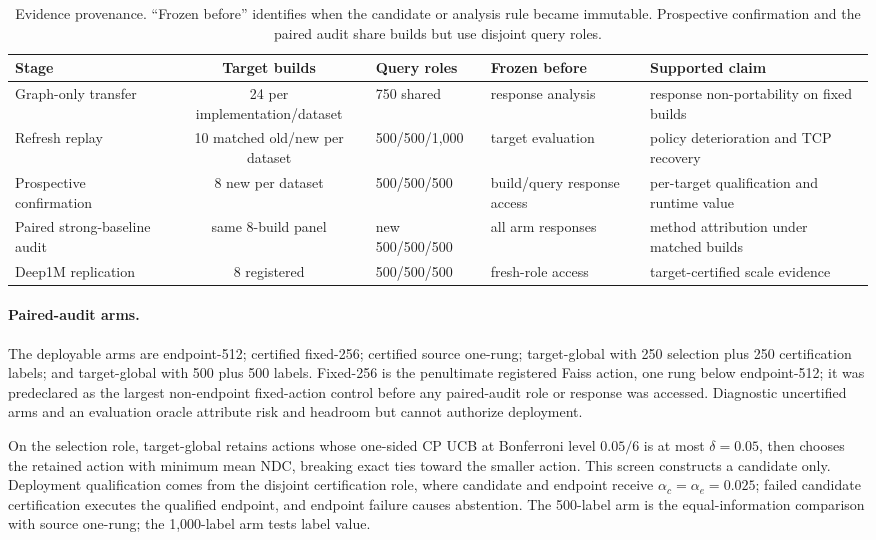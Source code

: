 \begin{table}[t]
\caption{Evidence provenance. ``Frozen before'' identifies when the candidate or analysis rule became immutable. Prospective confirmation and the paired audit share builds but use disjoint query roles.}
\label{tab:provenance}
\scriptsize
\begin{tabularx}{\textwidth}{@{}lcllX@{}}\toprule
Stage & Target builds & Query roles & Frozen before & Supported claim \\\midrule
Graph-only transfer & 24 per implementation/dataset & 750 shared & response analysis & response non-portability on fixed builds \\
Refresh replay & 10 matched old/new per dataset & 500/500/1,000 & target evaluation & policy deterioration and TCP recovery \\
Prospective confirmation & 8 new per dataset & 500/500/500 & build/query response access & per-target qualification and runtime value \\
Paired strong-baseline audit & same 8-build panel & new 500/500/500 & all arm responses & method attribution under matched builds \\
Deep1M replication & 8 registered & 500/500/500 & fresh-role access & target-certified scale evidence \\\bottomrule
\end{tabularx}
\end{table}

\paragraph{Paired-audit arms.}
The deployable arms are endpoint-512; certified fixed-256; certified source one-rung; target-global with 250 selection plus 250 certification labels; and target-global with 500 plus 500 labels. Fixed-256 is the penultimate registered Faiss action, one rung below endpoint-512; it was predeclared as the largest non-endpoint fixed-action control before any paired-audit role or response was accessed. Diagnostic uncertified arms and an evaluation oracle attribute risk and headroom but cannot authorize deployment.

On the selection role, target-global retains actions whose one-sided CP UCB at Bonferroni level $0.05/6$ is at most $\delta=0.05$, then chooses the retained action with minimum mean NDC, breaking exact ties toward the smaller action. This screen constructs a candidate only. Deployment qualification comes from the disjoint certification role, where candidate and endpoint receive $\alpha_c=\alpha_e=0.025$; failed candidate certification executes the qualified endpoint, and endpoint failure causes abstention. The 500-label arm is the equal-information comparison with source one-rung; the 1,000-label arm tests label value.

